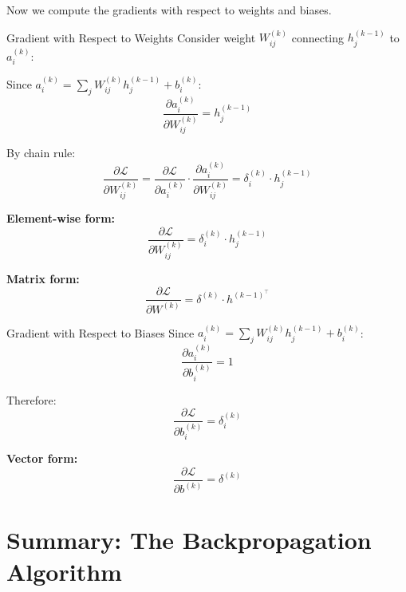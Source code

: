 Now we compute the gradients with respect to weights and biases.

\begin{derivation}{Gradient with Respect to Weights}
Consider weight $W_{ij}^{(k)}$ connecting $h_j^{(k-1)}$ to $a_i^{(k)}$:

Since $a_i^{(k)} = \sum_j W_{ij}^{(k)} h_j^{(k-1)} + b_i^{(k)}$:
\[
\frac{\partial a_i^{(k)}}{\partial W_{ij}^{(k)}} = h_j^{(k-1)}
\]

By chain rule:
\[
\frac{\partial \mathcal{L}}{\partial W_{ij}^{(k)}} = \frac{\partial \mathcal{L}}{\partial a_i^{(k)}} \cdot \frac{\partial a_i^{(k)}}{\partial W_{ij}^{(k)}} = \delta_i^{(k)} \cdot h_j^{(k-1)}
\]

\textbf{Element-wise form:}
\[
\boxed{\frac{\partial \mathcal{L}}{\partial W_{ij}^{(k)}} = \delta_i^{(k)} \cdot h_j^{(k-1)}}
\]

\textbf{Matrix form:}
\[
\boxed{\frac{\partial \mathcal{L}}{\partial W^{(k)}} = \delta^{(k)} \cdot h^{(k-1)^\top}}
\]
\end{derivation}

\begin{derivation}{Gradient with Respect to Biases}
Since $a_i^{(k)} = \sum_j W_{ij}^{(k)} h_j^{(k-1)} + b_i^{(k)}$:
\[
\frac{\partial a_i^{(k)}}{\partial b_i^{(k)}} = 1
\]

Therefore:
\[
\boxed{\frac{\partial \mathcal{L}}{\partial b_i^{(k)}} = \delta_i^{(k)}}
\]

\textbf{Vector form:}
\[
\boxed{\frac{\partial \mathcal{L}}{\partial b^{(k)}} = \delta^{(k)}}
\]
\end{derivation}

\section{Summary: The Backpropagation Algorithm}

